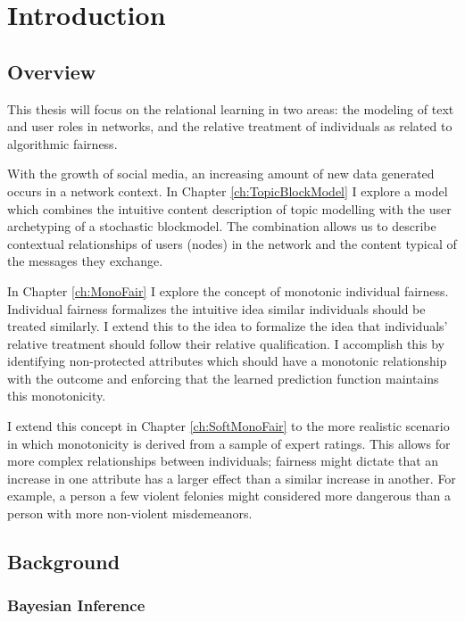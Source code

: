 \chapter{Introduction}

\section{Overview}

This thesis will focus on the relational learning in two areas: the modeling of text and user roles in networks, and the relative treatment of individuals as related to algorithmic fairness.

With the growth of social media, an increasing amount of new data generated occurs in a network context.  In Chapter \ref{ch:TopicBlockModel} I explore a model which combines the intuitive content description of topic modelling with the user archetyping of a stochastic blockmodel.  The combination allows us to describe contextual relationships of users (nodes) in the network and the content typical of the messages they exchange.

In Chapter \ref{ch:MonoFair} I explore the concept of monotonic individual fairness.  Individual fairness \citep{dwork2012fairness} formalizes the intuitive idea similar individuals should be treated similarly.  I extend this to the idea to formalize the idea that individuals' relative treatment should follow their relative qualification.  I accomplish this by identifying non-protected attributes which should have a monotonic relationship with the outcome and enforcing that the learned prediction function maintains this monotonicity.

I extend this concept in Chapter \ref{ch:SoftMonoFair} to the more realistic scenario in which monotonicity is derived from a sample of expert ratings.  This allows for more complex relationships between individuals; fairness might dictate that an increase in one attribute has a larger effect than a similar increase in another.  For example, a person a few violent felonies might considered more dangerous than a person with more non-violent misdemeanors.

\section{Background}

    \subsection{Bayesian Inference} \label{sec:intro_bayes}
    
